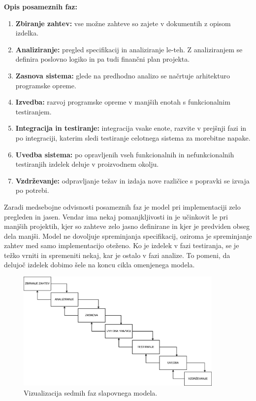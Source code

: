 \begin{description}
\item \textbf{Opis posameznih faz:}
\begin{enumerate}
\item \textbf{Zbiranje zahtev:} vse možne zahteve so zajete v dokumentih z opisom izdelka.
\item \textbf{Analiziranje:} pregled specifikacij in analiziranje le-teh. Z analiziranjem se definira poslovno logiko in pa tudi finančni plan projekta.
\item \textbf{Zasnova sistema:} glede na predhodno analizo se načrtuje arhitekturo programske opreme.
\item \textbf{Izvedba:} razvoj programske opreme v manjših enotah s funkcionalnim testiranjem.
\item \textbf{Integracija in testiranje:} integracija vsake enote, razvite v prejšnji fazi in po integraciji, katerim sledi testiranje celotnega sistema za morebitne napake.
\item \textbf{Uvedba sistema:} po opravljenih vseh funkcionalnih in nefunkcionalnih testiranjih izdelek deluje v proizvodnem okolju.
\item \textbf{Vzdrževanje:} odpravljanje težav in izdaja nove različice s popravki se izvaja po potrebi.
\end{enumerate}
\end{description}

Zaradi medsebojne odvisnosti posameznih faz je model pri implementaciji zelo pregleden in jasen. Vendar ima nekaj pomanjkljivosti in je učinkovit le pri manjših projektih, kjer so zahteve zelo jasno definirane in kjer je predviden obseg dela manjši.
Model ne dovoljuje spreminjanja specifikacij, oziroma je spreminjanje zahtev med samo implementacijo oteženo. Ko je izdelek v fazi testiranja, se je težko vrniti in spremeniti nekaj, kar je ostalo v fazi analize.
To pomeni, da delujoč izdelek dobimo šele na koncu cikla omenjenega modela.

\begin{figure}[h]
\begin{center}
\includegraphics[width=0.9\textwidth]{slike/waterfall.png}
\end{center}
\caption{ Vizualizacija sedmih faz slapovnega modela. }
\label{waterfall-phases}
\end{figure}

